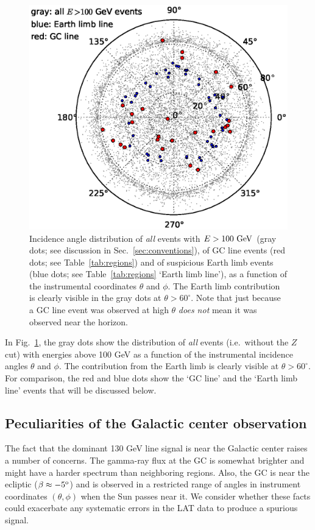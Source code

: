 \documentclass[aps,twocolumn,prd,superscriptaddress,showpacs,nofootinbib,fixfloat]{revtex4}
\newcommand{\GeV}{{\rm ~GeV}}
\newcommand{\degree}{^{\rm o}}
\begin{document}
\begin{figure}[h]
  \begin{center}
    \includegraphics[width=0.99\linewidth]{plots/polarCounts.eps}
    \vspace{-0.5cm}
  \end{center}
  \caption{Incidence angle distribution of \emph{all} events
  with $E>100\GeV$ (gray dots; see
  discussion in Sec.~\ref{sec:conventions}), of GC line
  events (red dots; see Table~\ref{tab:regions}) and of
  suspicious Earth limb events (blue dots; see
  Table~\ref{tab:regions} `Earth limb line'), as a function of
  the instrumental coordinates $\theta$ and $\phi$. The
  Earth limb contribution is clearly visible in the gray
  dots at $\theta > 60^\circ$.  Note that just because a GC line event was
  observed at high $\theta$ \emph{does not} mean it was observed near the
  horizon.}
  \label{fig:phiThetaDist}
\end{figure}

In
Fig.~\ref{fig:phiThetaDist}, the gray dots show the
distribution of \emph{all} events (i.e.~without the $Z$ cut)
with energies above 100 GeV as a function of the instrumental
incidence angles $\theta$ and $\phi$.
The contribution from the Earth limb is clearly visible at
$\theta>60^\circ$. For comparison, the red and blue dots
show the `GC line' and the `Earth limb line' events that
will be discussed below.

\subsection{Peculiarities of the Galactic center observation}
The fact that the dominant 130 GeV line signal is near the
Galactic center raises a number of concerns.  The gamma-ray
flux at the GC is somewhat brighter and might have a harder
spectrum than neighboring regions. Also, the GC is near the
ecliptic ($\beta \approx -5\degree$) and is observed in
a restricted range of angles in instrument coordinates
$(\theta, \phi)$ when the Sun passes near it.  We consider
whether these facts could exacerbate any systematic errors
in the LAT data to produce a spurious signal.
\end{document}
